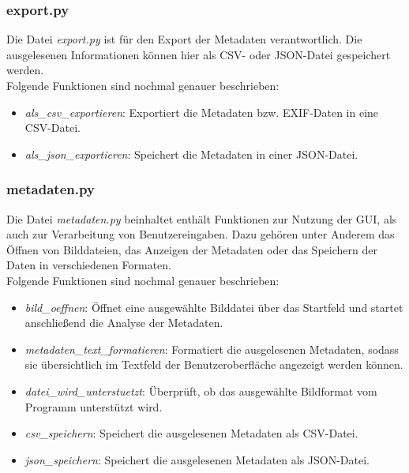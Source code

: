 \documentclass{Bild-Metadaten-Analyzer}
\begin{document}
\subsubsection{export.py}\label{subsubsec:export.py}
Die Datei \textit{export.py} ist für den Export der Metadaten verantwortlich. Die ausgelesenen Informationen können hier als CSV- 
oder JSON-Datei gespeichert werden.
\\Folgende Funktionen sind nochmal genauer beschrieben:
\begin{itemize}
    \item \textit{als\_csv\_exportieren}: Exportiert die Metadaten bzw. EXIF-Daten in eine CSV-Datei.
    \item \textit{als\_json\_exportieren}: Speichert die Metadaten in einer JSON-Datei.
\end{itemize}

\subsubsection{metadaten.py}\label{subsubsec:metadaten.py}
Die Datei \textit{metadaten.py} beinhaltet enthält Funktionen zur Nutzung der GUI, 
als auch zur Verarbeitung von Benutzereingaben. Dazu gehören unter Anderem das Öffnen von Bilddateien, das Anzeigen der Metadaten 
oder das Speichern der Daten in verschiedenen Formaten.
\\Folgende Funktionen sind nochmal genauer beschrieben:
\begin{itemize}
    \item \textit{bild\_oeffnen}: Öffnet eine ausgewählte Bilddatei über das Startfeld und startet anschließend die Analyse der Metadaten.
    \item \textit{metadaten\_text\_formatieren}: Formatiert die ausgelesenen Metadaten, sodass sie übersichtlich im Textfeld der Benutzeroberfläche angezeigt werden können.
    \item \textit{datei\_wird\_unterstuetzt}: Überprüft, ob das ausgewählte Bildformat vom Programm unterstützt wird.
    \item \textit{csv\_speichern}: Speichert die ausgelesenen Metadaten als CSV-Datei.
    \item \textit{json\_speichern}: Speichert die ausgelesenen Metadaten als JSON-Datei.
\end{itemize}
\end{document}
